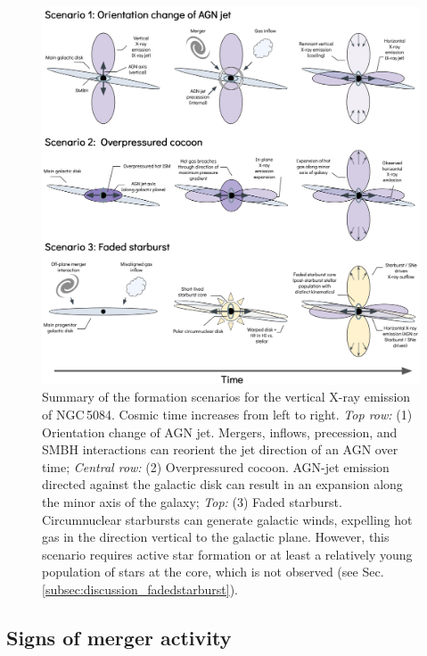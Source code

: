 \documentclass[modern]{CORE-AAS/aastex631}
\begin{document}
{\begin{figure}[t!]
\begin{center}
% 
\includegraphics[trim={0 0 0 0}, clip, width = \textwidth]{FIGURES/scenarios_figure.png}
\caption{Summary of the formation scenarios for the vertical X-ray emission of NGC\,5084. Cosmic time increases from left to right. \emph{Top row:} (1) Orientation change of AGN jet. Mergers, inflows, precession, and SMBH interactions can reorient the jet direction of an AGN over time; \emph{Central row:} (2) Overpressured cocoon. AGN-jet emission directed against the galactic disk can result in an expansion along the minor axis of the galaxy; \emph{Top:} (3) Faded starburst. Circumnuclear starbursts can generate galactic winds, expelling hot gas in the direction vertical to the galactic plane. However, this scenario requires active star formation or at least a relatively young population of stars at the core, which is not observed (see Sec.\,\ref{subsec:discussion_fadedstarburst}).} 
\label{fig:NGC5084_scenarios}
\end{center}
\end{figure}


\subsection{Signs of merger activity}
\label{subsec:discussion_merger}

}
\end{document}
